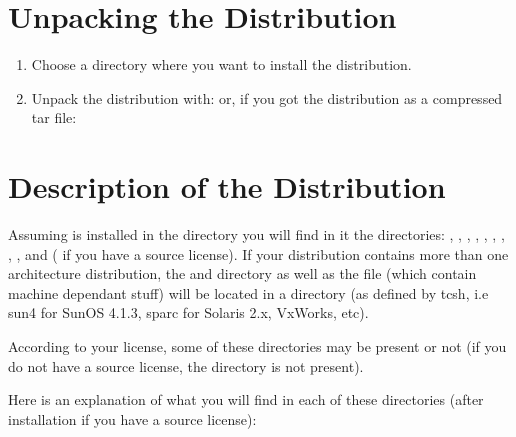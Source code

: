 \section{Unpacking the Distribution}

\begin{enumerate}

\item Choose a directory where you want to install the distribution. \*

\item Unpack the distribution with: \*
 \*
or, if you got the distribution as a compressed tar file: \*

\end{enumerate}

\section{Description of the Distribution}

Assuming \COPRSDE{} is installed in the directory  you
will find in it the directories: , , ,
, , , , ,
,  and  ( if you have a
source license).  If your distribution contains more than one architecture
distribution, the  and  directory as well as the
 file (which contain machine dependant stuff) will be located
in a  directory (as defined by tcsh, i.e sun4 for SunOS 4.1.3,
sparc for Solaris 2.x, VxWorks, etc).

According to your license, some of these directories may be present or not (if
you do not have a source license, the  directory is not present).

Here is an explanation of what you will find in each of these directories
(after installation if you have a source license):

